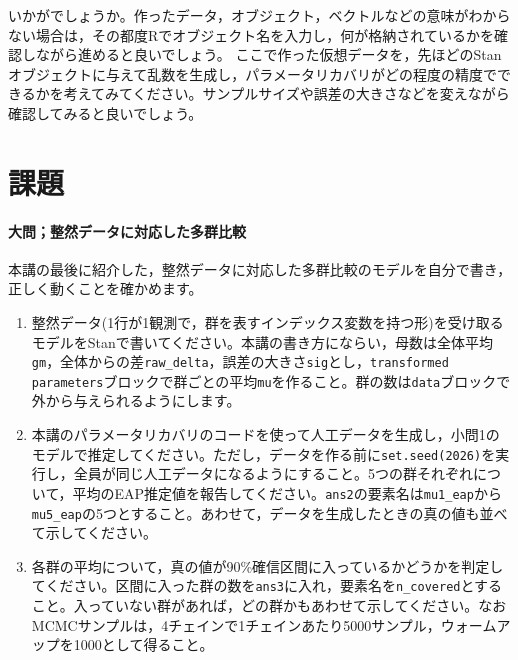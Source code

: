 \documentclass{ltjsbook}
\begin{document}
いかがでしょうか。作ったデータ，オブジェクト，ベクトルなどの意味がわからない場合は，その都度Rでオブジェクト名を入力し，何が格納されているかを確認しながら進めると良いでしょう。
ここで作った仮想データを，先ほどのStanオブジェクトに与えて乱数を生成し，パラメータリカバリがどの程度の精度でできるかを考えてみてください。サンプルサイズや誤差の大きさなどを変えながら確認してみると良いでしょう。
\section{課題}


\paragraph{大問；整然データに対応した多群比較}
本講の最後に紹介した，整然データに対応した多群比較のモデルを自分で書き，正しく動くことを確かめます。
\begin{enumerate}
	\item 整然データ(1行が1観測で，群を表すインデックス変数を持つ形)を受け取るモデルをStanで書いてください。本講の書き方にならい，母数は全体平均\verb|gm|，全体からの差\verb|raw_delta|，誤差の大きさ\verb|sig|とし，\verb|transformed parameters|ブロックで群ごとの平均\verb|mu|を作ること。群の数は\verb|data|ブロックで外から与えられるようにします。
	\item 本講のパラメータリカバリのコードを使って人工データを生成し，小問1のモデルで推定してください。ただし，データを作る前に\verb|set.seed(2026)|を実行し，全員が同じ人工データになるようにすること。5つの群それぞれについて，平均のEAP推定値を報告してください。\verb|ans2|の要素名は\verb|mu1_eap|から\verb|mu5_eap|の5つとすること。あわせて，データを生成したときの真の値も並べて示してください。
	\item 各群の平均について，真の値が90\%確信区間に入っているかどうかを判定してください。区間に入った群の数を\verb|ans3|に入れ，要素名を\verb|n_covered|とすること。入っていない群があれば，どの群かもあわせて示してください。なおMCMCサンプルは，4チェインで1チェインあたり5000サンプル，ウォームアップを1000として得ること。
\end{enumerate}
\end{document}

